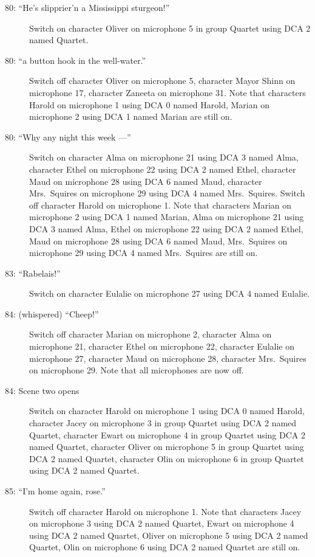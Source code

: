 \begin{description}
\item[80: ``He's slipprier'n a Mississippi sturgeon!'']
Switch on character Oliver on microphone 5 in group Quartet using DCA 2 named Quartet. 

\item[80: ``a button hook in the well-water.'']
Switch off character Oliver on microphone 5, character Mayor Shinn on microphone 17, character Zaneeta on microphone 31. Note that characters Harold on microphone 1 using DCA 0 named Harold, Marian on microphone 2 using DCA 1 named Marian are still on.  

\item[80: ``Why any night this week ---'']
Switch on character Alma on microphone 21 using DCA 3 named Alma, character Ethel on microphone 22 using DCA 2 named Ethel, character Maud on microphone 28 using DCA 6 named Maud, character Mrs.~Squires on microphone 29 using DCA 4 named Mrs.~Squires. Switch off character Harold on microphone 1. Note that characters Marian on microphone 2 using DCA 1 named Marian, Alma on microphone 21 using DCA 3 named Alma, Ethel on microphone 22 using DCA 2 named Ethel, Maud on microphone 28 using DCA 6 named Maud, Mrs.~Squires on microphone 29 using DCA 4 named Mrs.~Squires are still on.  

\item[83: ``Rabelais!'']
Switch on character Eulalie on microphone 27 using DCA 4 named Eulalie. 

\item[84: (whispered) ``Cheep!'']
Switch off character Marian on microphone 2, character Alma on microphone 21, character Ethel on microphone 22, character Eulalie on microphone 27, character Maud on microphone 28, character Mrs.~Squires on microphone 29. Note that all microphones are now off.

\item[84: Scene two opens]
Switch on character Harold on microphone 1 using DCA 0 named Harold, character Jacey on microphone 3 in group Quartet using DCA 2 named Quartet, character Ewart on microphone 4 in group Quartet using DCA 2 named Quartet, character Oliver on microphone 5 in group Quartet using DCA 2 named Quartet, character Olin on microphone 6 in group Quartet using DCA 2 named Quartet. 

\item[85: ``I'm home again, rose.'']
Switch off character Harold on microphone 1. Note that characters Jacey on microphone 3 using DCA 2 named Quartet, Ewart on microphone 4 using DCA 2 named Quartet, Oliver on microphone 5 using DCA 2 named Quartet, Olin on microphone 6 using DCA 2 named Quartet are still on.  


\end{description}
